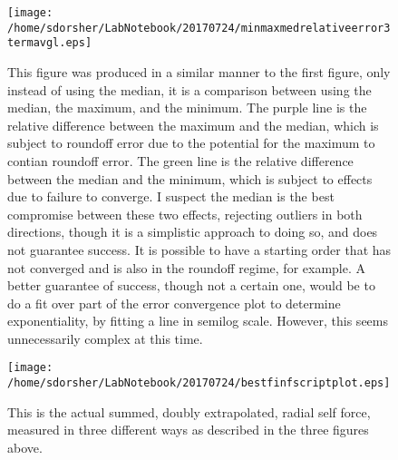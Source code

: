 \documentclass{article}
\begin{document}
\begin{figure}
  \texttt{[image: /home/sdorsher/LabNotebook/20170724/minmaxmedrelativeerror3termavgl.eps]}
  \caption{This figure was produced in a similar manner to the first figure, only instead of using the median, it is a comparison between using the median, the maximum, and the minimum. The purple line is the relative difference between the maximum and the median, which is subject to roundoff error due to the potential for the maximum to contian roundoff error. The green line is the relative difference between the median and the minimum, which is subject to effects due to failure to converge. I suspect the median is the best compromise between these two effects, rejecting outliers in both directions, though it is a simplistic approach to doing so, and does not guarantee success. It is possible to have a starting order that has not converged and is also in the roundoff regime, for example. A better guarantee of success, though not a certain one, would be to do a fit over part of the error convergence plot to determine exponentiality, by fitting a line in semilog scale. However, this seems unnecessarily complex at this time.}
\end{figure}
  
\begin{figure}
  \texttt{[image: /home/sdorsher/LabNotebook/20170724/bestfinfscriptplot.eps]}
  \caption{This is the actual summed, doubly extrapolated, radial self force, measured in three different ways as described in the three figures above.}
\end{figure}
\end{document}
